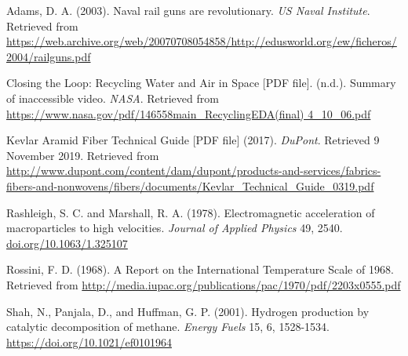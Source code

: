 \documentclass[a4paper]{article}
\begin{document}
\newpage
\begin{thebibliography}{6} %
Adams, D. A. (2003). Naval rail guns are revolutionary. \textit{US Naval Institute}. Retrieved from \url{https://web.archive.org/web/20070708054858/http://edusworld.org/ew/ficheros/2004/railguns.pdf}

Closing the Loop: Recycling Water and Air in Space [PDF file]. (n.d.). Summary of inaccessible video. \textit{NASA}. Retrieved from \url{https://www.nasa.gov/pdf/146558main_RecyclingEDA(final) 4_10_06.pdf}

Kevlar Aramid Fiber Technical Guide [PDF file] (2017). \textit{DuPont}. Retrieved 9 November 2019. Retrieved from \url{http://www.dupont.com/content/dam/dupont/products-and-services/fabrics-fibers-and-nonwovens/fibers/documents/Kevlar_Technical_Guide_0319.pdf}

Rashleigh, S. C. and Marshall, R. A. (1978). Electromagnetic acceleration of macroparticles to high velocities. \textit{Journal of Applied Physics} 49, 2540. \url{doi.org/10.1063/1.325107}	

Rossini, F. D. (1968). A Report on the International Temperature Scale of 1968. Retrieved from \url{http://media.iupac.org/publications/pac/1970/pdf/2203x0555.pdf}

Shah, N., Panjala, D., and Huffman, G. P. (2001). Hydrogen production by catalytic decomposition of methane. \textit{Energy Fuels} 15, 6, 1528-1534. \url{https://doi.org/10.1021/ef0101964}
\end{thebibliography}
\end{document}

